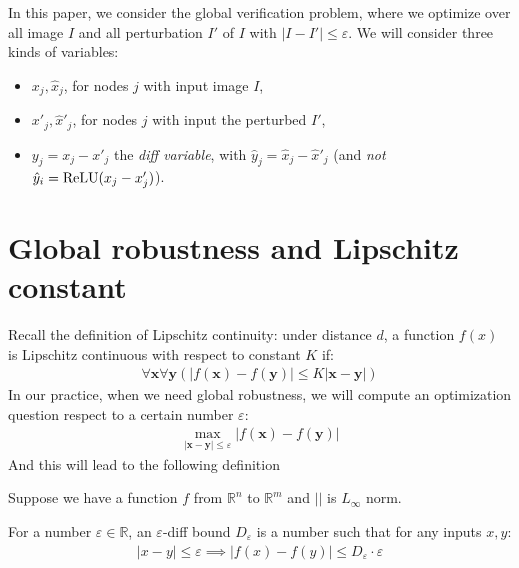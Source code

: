     In this paper, we consider the global verification problem, where we optimize over all image $I$ and all perturbation $I'$ of $I$ with $|I-I'| \leq \varepsilon$. 	We will consider three kinds of variables: 
    \begin{itemize}
    \item $x_j,\hat{x}_j$, for nodes $j$ with input image $I$, 
    \item $x'_j,\hat{x}'_j$, for nodes $j$ with input the perturbed $I'$, 
    \item  $y_j = x_j - x'_j$ the {\em diff variable}, with 
    $\hat{y}_j = \hat{x}_j - \hat{x}'_j$ (and {\em not} 
    $\hat{y}_i = \mathrm{ReLU}(x_j-x'_j)$). 
    \end{itemize}
     
	
	
	
	\iffalse
	
	\section{Global robustness and Lipschitz constant}
	
	
	Recall the definition of Lipschitz continuity:
	under distance $d$, a function $f(x)$ is Lipschitz continuous with respect to constant $K$ if:
	\begin{align*}
		\forall \boldsymbol{x} \forall\boldsymbol{y} (|f(\boldsymbol{x}) -f(\boldsymbol{y}) |\leq K|\boldsymbol{x}-\boldsymbol{y}|)
	\end{align*} 
	In our practice, when we need global robustness, we will compute an optimization question respect to a certain number $\varepsilon$:	\begin{align}\label{global_robustness}
		\max_{|\boldsymbol{x}-\boldsymbol{y}| \leq \varepsilon} |f(\boldsymbol{x}) -f(\boldsymbol{y}) |
	\end{align} And this will lead to the following definition
	
	\begin{definition}
		Suppose we have a function $f$ from $\mathbb{R}^n$ to $\mathbb{R}^m$ and $||$ is $L_\infty$ norm. 
		
		For a number $\varepsilon\in\mathbb{R}$, an $\varepsilon$-diff bound $D_\varepsilon$ is a number such that for any inputs $x,y$: \begin{align*}
			|x-y|\leq \varepsilon \implies |f(x)-f(y)| \leq D_\varepsilon \cdot \varepsilon
		\end{align*}
		
	\end{definition}
	
